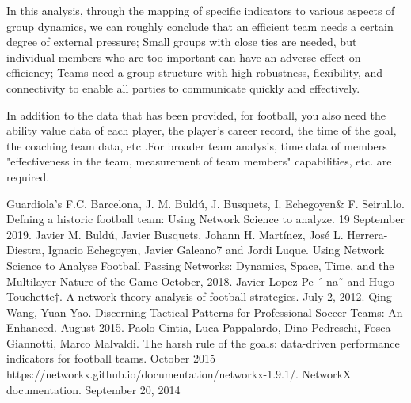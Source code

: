 \documentclass{mcmthesis}
\begin{document}
In this analysis, through the mapping of specific indicators to various aspects of group dynamics, we can roughly conclude that an efficient team needs a certain degree of external pressure; Small groups with close ties are needed, but individual members who are too important can have an adverse effect on efficiency; Teams need a group structure with high robustness, flexibility, and connectivity to enable all parties to communicate quickly and effectively.

In addition to the data that has been provided, for football, you also need the ability value data of each player, the player's career record, the time of the goal, the coaching team data, etc .For broader team analysis, time data of members "effectiveness in the team, measurement of team members" capabilities, etc. are required.

\begin{thebibliography}{99}
 Guardiola's F.C. Barcelona, J. M. Buldú, J. Busquets, I. Echegoyen\& F. Seirul.lo. Defning a historic football team: Using Network Science to analyze. 19 September 2019.
 Javier M. Buldú, Javier Busquets,  Johann H. Martínez, José L. Herrera-Diestra, Ignacio Echegoyen, Javier Galeano7 and Jordi Luque. Using Network Science to Analyse Football Passing Networks: Dynamics, Space, Time, and the Multilayer Nature of the Game October, 2018.
 Javier Lopez Pe ´ na˜ and Hugo Touchette†. A network theory analysis of football strategies. July 2, 2012.
 Qing Wang, Yuan Yao. Discerning Tactical Patterns for Professional Soccer Teams: An Enhanced. August 2015.
 Paolo Cintia, Luca Pappalardo, Dino Pedreschi, Fosca Giannotti, Marco Malvaldi. The harsh rule of the goals: data-driven performance indicators for football teams. October 2015
 https://networkx.github.io/documentation/networkx-1.9.1/. NetworkX documentation. September 20, 2014

\end{thebibliography}
\end{document}
